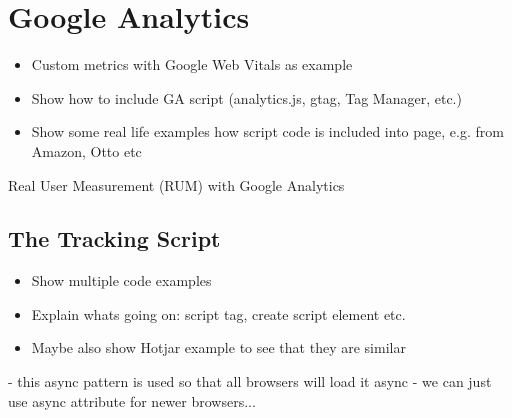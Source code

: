 






\section{Google Analytics}

\begin{itemize}
    \item Custom metrics with Google Web Vitals as example
    \item Show how to include GA script (analytics.js, gtag, Tag Manager, etc.)
    \item Show some real life examples how script code is included into page, e.g. from Amazon, Otto etc
\end{itemize}


Real User Measurement (RUM) with Google Analytics


\subsection{The Tracking Script}

\begin{itemize}
\item Show multiple code examples
\item Explain whats going on: script tag, create script element etc.
\item Maybe also show Hotjar example to see that they are similar
\end{itemize}




- this async pattern is used so that all browsers will load it async
- we can just use async attribute for newer browsers...






